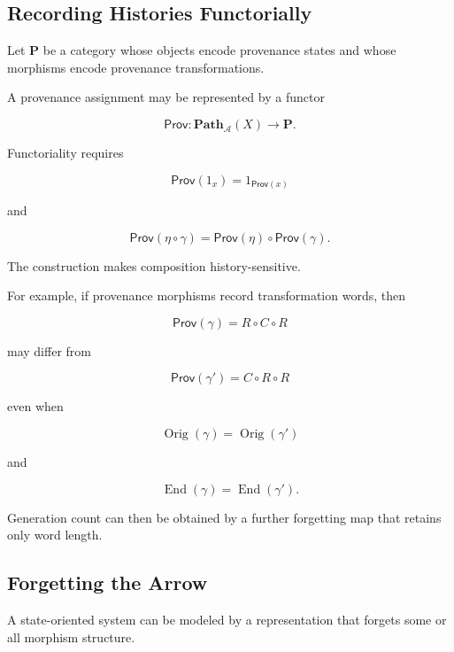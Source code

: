 \documentclass[
  11pt,
  a4paper,
  DIV=12,
  BCOR=0mm,
  parskip=half-
]{scrartcl}
\newcommand{\End}{\operatorname{End}}
\newcommand{\Orig}{\operatorname{Orig}}
\theoremstyle{definition}
\theoremstyle{plain}
\theoremstyle{remark}
\begin{document}

\subsection{Recording Histories Functorially}
\label{app:provenance-functor}

Let \(\mathbf P\) be a category whose objects encode provenance states and
whose morphisms encode provenance transformations.

A provenance assignment may be represented by a functor

\[
  \mathsf{Prov}:
  \mathbf{Path}_{\mathcal A}(X)
  \to
  \mathbf P.
\]

Functoriality requires

\[
  \mathsf{Prov}(1_x)
  =
  1_{\mathsf{Prov}(x)}
\]

and

\[
  \mathsf{Prov}(\eta\circ\gamma)
  =
  \mathsf{Prov}(\eta)
  \circ
  \mathsf{Prov}(\gamma).
\]

The construction makes composition history-sensitive.

For example, if provenance morphisms record transformation words, then

\[
  \mathsf{Prov}(\gamma)
  =
  R\circ C\circ R
\]

may differ from

\[
  \mathsf{Prov}(\gamma')
  =
  C\circ R\circ R
\]

even when

\[
  \Orig(\gamma)=\Orig(\gamma')
\]

and

\[
  \End(\gamma)=\End(\gamma').
\]

Generation count can then be obtained by a further forgetting map that retains
only word length.


\subsection{Forgetting the Arrow}
\label{app:forgetful-arrow}

A state-oriented system can be modeled by a representation that forgets some
or all morphism structure.
\end{document}
